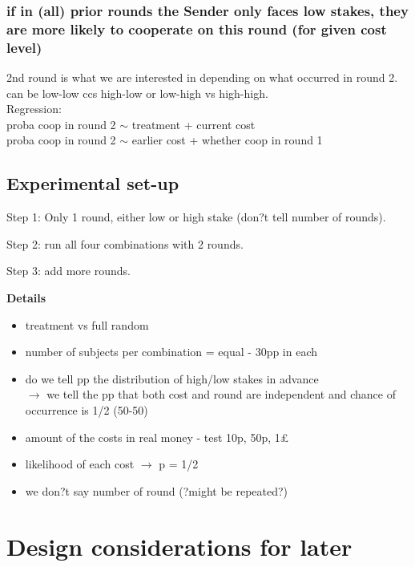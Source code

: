 \documentclass[11pt]{article}
\theoremstyle{plainCl1}
\begin{document}
\subsubsection{if in (all) prior rounds the Sender only faces low stakes, they are more likely to cooperate on this round (for given cost level)} 
2nd round is what we are interested in depending on what occurred in round 2.
can be low-low ccs high-low or low-high vs high-high. \\

\noindent
Regression: \\
proba coop in round 2 $\sim$ treatment + current cost \\
proba coop in round 2 $\sim$ earlier cost + whether coop in round 1 \\

\subsection{Experimental set-up}

\begin{description}
	\item Step 1: Only 1 round, either low or high stake (don?t tell number of rounds).
	\item Step 2: run all four combinations with 2 rounds.
	\item Step 3: add more rounds.
\end{description}

\noindent
\textbf{Details}
\begin{itemize}
	\item treatment vs full random
	\item number of subjects per combination = equal - 30pp in each
	\item do we tell pp the distribution of high/low stakes in advance \\ 
	$\rightarrow$ we tell the pp that both cost and round are independent and chance of occurrence is 1/2 (50-50)
	\item amount of the costs in real money - test 10p, 50p, 1\pounds
	\item likelihood of each cost $\rightarrow$ p = 1/2
	\item we don?t say number of round (?might be repeated?)
\end{itemize}

\section{Design considerations for later}
\end{document}
